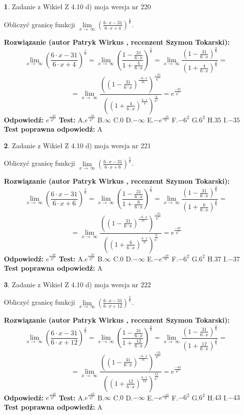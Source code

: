 \documentclass[12pt, a4paper]{article}
\theoremstyle{definition} %
\newtheorem{zad}{}
\newcommand{\zadStart}[1]{\begin{zad}#1\newline}
\newcommand{\zadStop}{\end{zad}}
\newcommand{\rozwStart}[2]{\noindent \textbf{Rozwiązanie (autor #1 , recenzent #2): }\newline}
\newcommand{\rozwStop}{\newline}
\newcommand{\odpStart}{\noindent \textbf{Odpowiedź:}\newline}
\newcommand{\odpStop}{\newline}
\newcommand{\testStart}{\noindent \textbf{Test:}\newline}
\newcommand{\testStop}{\newline}
\newcommand{\kluczStart}{\noindent \textbf{Test poprawna odpowiedź:}\newline}
\newcommand{\kluczStop}{\newline}
\begin{document}
\zadStart{Zadanie z Wikieł Z 4.10 d) moja wersja nr 220}


Obliczyć granicę funkcji  $\lim\limits_{x\to\ \infty}(\frac{6\cdot x-31}{6\cdot x+4})^{\frac{x}{6}}$.
\zadStop
\rozwStart{Patryk Wirkus}{Szymon Tokarski}
$$\lim\limits_{x\to\ \infty}(\frac{6\cdot x-31}{6\cdot x+4})^{\frac{x}{6}} = \lim\limits_{x\to\ \infty}(\frac{1-\frac{31}{6\cdot x}}{1+\frac{4}{6\cdot x}})^{\frac{x}{6}}=\lim\limits_{x\to\ \infty}\frac{(1-\frac{31}{6\cdot x})^{\frac{x}{6}}}{(1+\frac{4}{6\cdot x})^{\frac{x}{6}}}=$$
$$=\lim\limits_{x\to\ \infty}\frac{((1-\frac{31}{6\cdot x})^{\frac{-6\cdot x}{31}})^{\frac{-31}{6^{2}}}}{((1+\frac{4}{6\cdot x})^{\frac{6\cdot x}{4}})^{\frac{4}{6^{2}}}}=e^{\frac{-35}{6^{2}}}$$
\rozwStop
\odpStart
$e^{\frac{-35}{6^{2}}}$
\odpStop
\testStart
A.$e^{\frac{-35}{6^{2}}}$ B.$\infty$ C.$0$ D.$-\infty$ E.$-e^{\frac{-35}{6}}$
F.$-6^{2}$ G.$6^{2}$
H.$35$
I.$-35$
\testStop
\kluczStart
A
\kluczStop



\zadStart{Zadanie z Wikieł Z 4.10 d) moja wersja nr 221}


Obliczyć granicę funkcji  $\lim\limits_{x\to\ \infty}(\frac{6\cdot x-31}{6\cdot x+6})^{\frac{x}{6}}$.
\zadStop
\rozwStart{Patryk Wirkus}{Szymon Tokarski}
$$\lim\limits_{x\to\ \infty}(\frac{6\cdot x-31}{6\cdot x+6})^{\frac{x}{6}} = \lim\limits_{x\to\ \infty}(\frac{1-\frac{31}{6\cdot x}}{1+\frac{6}{6\cdot x}})^{\frac{x}{6}}=\lim\limits_{x\to\ \infty}\frac{(1-\frac{31}{6\cdot x})^{\frac{x}{6}}}{(1+\frac{6}{6\cdot x})^{\frac{x}{6}}}=$$
$$=\lim\limits_{x\to\ \infty}\frac{((1-\frac{31}{6\cdot x})^{\frac{-6\cdot x}{31}})^{\frac{-31}{6^{2}}}}{((1+\frac{6}{6\cdot x})^{\frac{6\cdot x}{6}})^{\frac{6}{6^{2}}}}=e^{\frac{-37}{6^{2}}}$$
\rozwStop
\odpStart
$e^{\frac{-37}{6^{2}}}$
\odpStop
\testStart
A.$e^{\frac{-37}{6^{2}}}$ B.$\infty$ C.$0$ D.$-\infty$ E.$-e^{\frac{-37}{6}}$
F.$-6^{2}$ G.$6^{2}$
H.$37$
I.$-37$
\testStop
\kluczStart
A
\kluczStop



\zadStart{Zadanie z Wikieł Z 4.10 d) moja wersja nr 222}


Obliczyć granicę funkcji  $\lim\limits_{x\to\ \infty}(\frac{6\cdot x-31}{6\cdot x+12})^{\frac{x}{6}}$.
\zadStop
\rozwStart{Patryk Wirkus}{Szymon Tokarski}
$$\lim\limits_{x\to\ \infty}(\frac{6\cdot x-31}{6\cdot x+12})^{\frac{x}{6}} = \lim\limits_{x\to\ \infty}(\frac{1-\frac{31}{6\cdot x}}{1+\frac{12}{6\cdot x}})^{\frac{x}{6}}=\lim\limits_{x\to\ \infty}\frac{(1-\frac{31}{6\cdot x})^{\frac{x}{6}}}{(1+\frac{12}{6\cdot x})^{\frac{x}{6}}}=$$
$$=\lim\limits_{x\to\ \infty}\frac{((1-\frac{31}{6\cdot x})^{\frac{-6\cdot x}{31}})^{\frac{-31}{6^{2}}}}{((1+\frac{12}{6\cdot x})^{\frac{6\cdot x}{12}})^{\frac{12}{6^{2}}}}=e^{\frac{-43}{6^{2}}}$$
\rozwStop
\odpStart
$e^{\frac{-43}{6^{2}}}$
\odpStop
\testStart
A.$e^{\frac{-43}{6^{2}}}$ B.$\infty$ C.$0$ D.$-\infty$ E.$-e^{\frac{-43}{6}}$
F.$-6^{2}$ G.$6^{2}$
H.$43$
I.$-43$
\testStop
\kluczStart
A
\kluczStop
\end{document}
